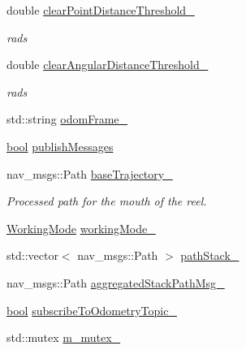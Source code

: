 \begin{DoxyCompactItemize}
double \hyperlink{classcl__move__base__z_1_1odom__tracker_1_1OdomTracker_a7155d25d0e8dd9f237a79ff503b80e26}{clear\+Point\+Distance\+Threshold\+\_\+}
\begin{DoxyCompactList}\small\item\em rads \end{DoxyCompactList}\item 
double \hyperlink{classcl__move__base__z_1_1odom__tracker_1_1OdomTracker_a1b79dd86745adfb31db822e0c8106282}{clear\+Angular\+Distance\+Threshold\+\_\+}
\begin{DoxyCompactList}\small\item\em rads \end{DoxyCompactList}\item 
std\+::string \hyperlink{classcl__move__base__z_1_1odom__tracker_1_1OdomTracker_a54f31af5e74006560d94f266297853d4}{odom\+Frame\+\_\+}
\item 
\hyperlink{classbool}{bool} \hyperlink{classcl__move__base__z_1_1odom__tracker_1_1OdomTracker_a4f253d45ab5750dee3c2f18dd5599725}{publish\+Messages}
\item 
nav\+\_\+msgs\+::\+Path \hyperlink{classcl__move__base__z_1_1odom__tracker_1_1OdomTracker_a466d18a86df049f0f680e043bb5ea91f}{base\+Trajectory\+\_\+}
\begin{DoxyCompactList}\small\item\em Processed path for the mouth of the reel. \end{DoxyCompactList}\item 
\hyperlink{namespacecl__move__base__z_1_1odom__tracker_ac46b05813b2791604f6cd0a39ace3ef8}{Working\+Mode} \hyperlink{classcl__move__base__z_1_1odom__tracker_1_1OdomTracker_a5ae598c85c4469f4c0e984480575c42b}{working\+Mode\+\_\+}
\item 
std\+::vector$<$ nav\+\_\+msgs\+::\+Path $>$ \hyperlink{classcl__move__base__z_1_1odom__tracker_1_1OdomTracker_a1ccad1b568b6c65da43ba6639b6bd1ef}{path\+Stack\+\_\+}
\item 
nav\+\_\+msgs\+::\+Path \hyperlink{classcl__move__base__z_1_1odom__tracker_1_1OdomTracker_a0fb60113ace2791a1f1bbeed59946404}{aggregated\+Stack\+Path\+Msg\+\_\+}
\item 
\hyperlink{classbool}{bool} \hyperlink{classcl__move__base__z_1_1odom__tracker_1_1OdomTracker_afbe614b53a1493eb8268b8ea65b5b93a}{subscribe\+To\+Odometry\+Topic\+\_\+}
\item 
std\+::mutex \hyperlink{classcl__move__base__z_1_1odom__tracker_1_1OdomTracker_aa371639e1eee269273dec8d3ab9dba0f}{m\+\_\+mutex\+\_\+}
\end{DoxyCompactItemize}


